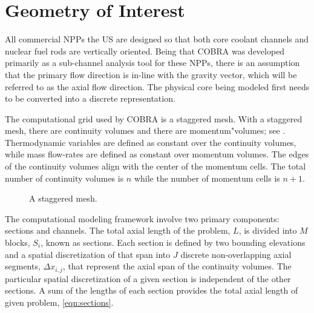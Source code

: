 \section{Geometry of Interest}
\label{sect:topology}
All commercial NPPs the US are designed so that both core coolant channels and nuclear fuel rods are vertically oriented.
Being that COBRA was developed primarily as a sub-channel analysis tool for these NPPs, there is an assumption that the primary flow direction is in-line with the gravity vector, which will be referred to as the axial flow direction.
The physical core being modeled first needs to be converted into a discrete representation. 

The computational grid used by COBRA is a staggered mesh.
With a staggered mesh, there are continuity volumes and there are momentum"volumes; see .
Thermodynamic variables are defined as constant over the continuity volumes, while mass flow-rates are defined as constant over momentum volumes.
The edges of the continuity volumes align with the center of the momentum cells.
The total number of continuity volumes is $n$ while the number of momentum cells is $n+1$. 

\begin{figure}[ht]
\caption{A staggered mesh.}
\label{fig:staggered_mesh}
\begin{center}
\end{center}
\end{figure}

The computational modeling framework involve two primary components: sections and channels.
The total axial length of the problem, $L$, is divided into $M$ blocks, $S_i$, known as sections.
Each section is defined by two bounding elevations and a spatial discretization of that span into $J$ discrete non-overlapping axial segments, $\Delta x_{i,j}$, that represent the axial span of the continuity volumes.
The particular spatial discretization of a given section is independent of the other sections.
A sum of the lengths of each section provides the total axial length of given problem, \eqref{eqn:sections}.

